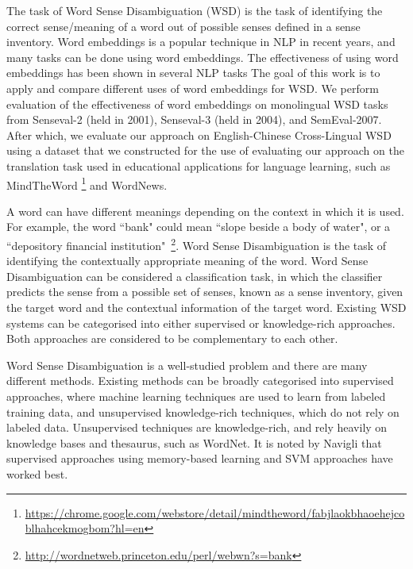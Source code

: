 The task of Word Sense Disambiguation (WSD) is the task of identifying the correct sense/meaning of a word out of possible senses defined in a sense inventory. Word embeddings is a popular technique in NLP in recent years, and many tasks can be done using 
word embeddings. The effectiveness of
using word embeddings has been shown in 
several NLP tasks \cite{Turian10wordrepresentations}
The goal of this work is to apply and compare different uses of word embeddings for WSD. We perform evaluation of the effectiveness of word embeddings on monolingual WSD tasks from Senseval-2 (held in 2001), Senseval-3 (held in 2004), and SemEval-2007. After which, we evaluate our approach on 
English-Chinese Cross-Lingual WSD using a dataset that we constructed for the use of evaluating our approach on the translation task used in educational applications for language learning, such as MindTheWord {\footnote{\url{https://chrome.google.com/webstore/detail/mindtheword/fabjlaokbhaoehejcoblhahcekmogbom?hl=en}}} and WordNews.



A word can have different meanings depending on the context in which it is used. For example, the word ``bank" could mean ``slope beside a body of water", or a ``depository financial institution"~\footnote{\url{http://wordnetweb.princeton.edu/perl/webwn?s=bank}}. Word Sense Disambiguation is the task of identifying the contextually appropriate meaning of the word. Word Sense Disambiguation can be considered a classification task, in which the classifier predicts the sense from a possible set of senses, known as a sense inventory, given the target word and the contextual information of the target word. Existing WSD systems can be categorised into either supervised or knowledge-rich approaches. Both approaches are considered to be complementary to each other. 


Word Sense Disambiguation is a well-studied problem and there are many different methods. Existing methods can be broadly categorised into supervised approaches, where machine learning techniques are used to learn from labeled training data, and unsupervised knowledge-rich techniques, which do not rely on labeled data. Unsupervised techniques are knowledge-rich, and rely heavily on knowledge bases and thesaurus, such as WordNet. It is noted by Navigli  that supervised approaches using memory-based learning and SVM approaches have worked best. 

